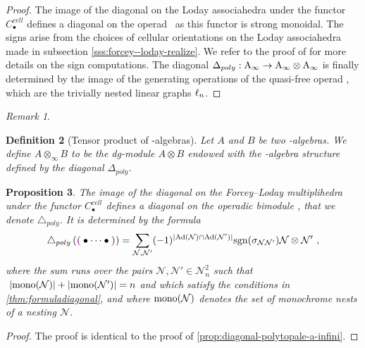 \documentclass[twoside, 12pt]{amsart}
\newtheorem{definition}{Definition}[section]
\newtheorem{proposition}[definition]{Proposition}
\theoremstyle{remark}
\newtheorem{remark}[definition]{\sc Remark}
\begin{document}
\begin{proof}
The image of the diagonal on the Loday associahedra under the functor $C_\bullet^{cell}$ defines a diagonal on the operad \Ainf\ as this functor is strong monoidal. 
The signs arise from the choices of cellular orientations on the Loday associahedra made in subsection \ref{sss:forcey--loday-realize}. We refer to the proof of \cite[Proposition 4.27]{LA21} for more details on the sign computations. The diagonal $\Delta_{poly} : \mathrm{A}_\infty \rightarrow \mathrm{A}_\infty \otimes \mathrm{A}_\infty$ is finally determined by the image of the generating operations of the quasi-free operad \Ainf , which are the trivially nested linear graphs $\ell_n$.
\end{proof}


\begin{remark}
\end{remark}

\begin{definition}[Tensor product of \Ainf -algebras]
Let $A$ and $B$ be two \Ainf -algebras. We define $A \otimes_\infty B$ to be the dg-module $A \otimes B$ endowed with the \Ainf -algebra structure defined by the diagonal $\Delta_{poly}$.
\end{definition}

\begin{proposition}
\label{prop:diagonal-polytopale-m-infini}
The image of the diagonal on the Forcey--Loday multiplihedra under the functor $C_\bullet^{cell}$ defines a diagonal on the operadic bimodule \Minf , that we denote $\triangle_{poly}$. It is determined by the formula
\[ \triangle_{poly} \left( \purple{\bullet \cdots \bullet} \right) = 
\sum_{
\mathcal{N},\mathcal{N}'} 
(-1)^{|\mathrm{Ad}(\mathcal{N})\cap \mathrm{Ad}(\mathcal{N}')|}
\mathrm{sgn}(\sigma_{\mathcal{N}\mathcal{N}'})
\mathcal{N} \otimes \mathcal{N}' \ ,\]
where the sum runs over the pairs $\mathcal{N},\mathcal{N}' \in \mathcal{N}^2_n$ such that $\ |\mono(\mathcal{N})|+|\mono(\mathcal{N}')|=n$ and which satisfy the conditions in \cref{thm:formuladiagonal}, and where $\mathrm{mono}(\mathcal{N})$ denotes the set of monochrome nests of a nesting $\mathcal{N}$. 
\end{proposition}

\begin{proof}
The proof is identical to the proof of \cref{prop:diagonal-polytopale-a-infini}. 
\end{proof}
\end{document}
